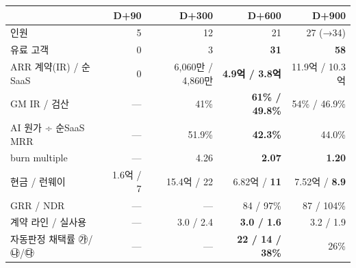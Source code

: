\documentclass[10pt]{article}
\newcommand{\hd}[1]{{\color{navy}\bfseries\large #1}\par\vspace{1pt}{\color{navy}\rule{\linewidth}{0.6pt}}\par\vspace{3pt}}
\begin{document}
\begin{minipage}[t]{0.46\linewidth}
\vspace{3pt}\hd{네 단계 — 핵심 숫자}
\begin{tabularx}{\linewidth}{@{}l r r r r@{}}
\toprule
 & \textbf{D+90} & \textbf{D+300} & \textbf{D+600} & \textbf{D+900}\\
\midrule
인원 & 5 & 12 & 21 & 27 (→34)\\
유료 고객 & 0 & 3 & \textbf{31} & \textbf{58}\\
ARR 계약(IR) / 순SaaS & 0 & 6,060만 / 4,860만 & \textbf{4.9억 / 3.8억} & 11.9억 / 10.3억\\
GM IR / 검산 & — & 41\% & \textbf{61\% / 49.8\%} & 54\% / 46.9\%\\
AI 원가 ÷ 순SaaS MRR & — & 51.9\% & \textbf{42.3\%} & 44.0\%\\
burn multiple & — & 4.26 & \textbf{2.07} & \textbf{1.20}\\
현금 / 런웨이 & 1.6억 / 7 & 15.4억 / 22 & 6.82억 / \textbf{11} & 7.52억 / \textbf{8.9}\\
GRR / NDR & — & — & 84 / 97\% & 87 / 104\%\\
계약 라인 / 실사용 & — & 3.0 / 2.4 & \textbf{3.0 / 1.6} & 3.2 / 1.9\\
자동판정 채택률 ㉮/㉯/㉰ & — & — & \textbf{22 / 14 / 38\%} & 26\%\\
\bottomrule
\end{tabularx}
\end{minipage}\hfill
\end{document}

